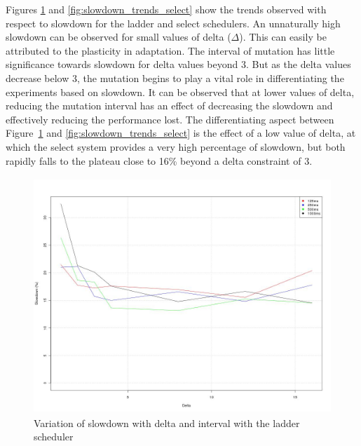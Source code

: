 Figures \ref{fig:slowdown_trends_ladder} and \ref{fig:slowdown_trends_select} show the trends
observed with respect to slowdown for the ladder and select schedulers. An unnaturally 
high slowdown can be observed for small values of delta ($\Delta$). This can easily be attributed
to the plasticity in adaptation. The interval of mutation has little significance towards slowdown
for delta values beyond 3. But as the delta values decrease below 3, the mutation begins to play a vital 
role in differentiating the experiments based on slowdown. It can be observed that at lower values
of delta, reducing the mutation interval has an effect of decreasing the slowdown and effectively 
reducing the performance lost. The differentiating aspect between Figure~\ref{fig:slowdown_trends_ladder} 
and \ref{fig:slowdown_trends_select} is the effect of a low value of delta, at which the select system
provides a very high percentage of slowdown, but both rapidly falls to the plateau close to 16\% beyond 
a delta constraint of 3. 

\begin{figure}[h!]
  \begin{center}
    \includegraphics[height=3.5in]{figures/trends_slowdown_ladder.jpg}%
    \caption{Variation of slowdown with delta and interval with the ladder scheduler}
    \label{fig:slowdown_trends_ladder}
  \end{center}
\end{figure}


